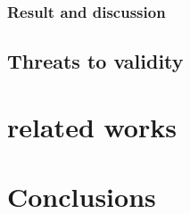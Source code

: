 \documentclass{sig-alternate}
\begin{document}
\subsubsection{Result and discussion}


\subsection{Threats to validity}


\section{related works}


\section{Conclusions}




%

%
%
%
\end{document}

